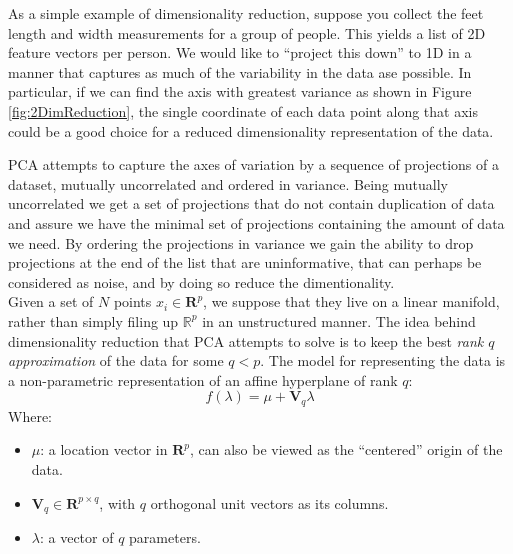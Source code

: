 \documentclass[a4paper]{article}
\begin{document}
As a simple example of dimensionality reduction, suppose you collect the feet length and width measurements for a group of people.  This yields a list of 2D feature vectors per person.  We would like to ``project this down'' to 1D in a manner that captures as much of the variability in the data ase possible.  In particular, if we can find the axis with greatest variance
as shown in Figure \ref{fig:2DimReduction}, the single coordinate of each data point along that axis could be a good choice for a reduced dimensionality representation of the data.

PCA attempts to capture the axes of variation by a sequence of projections of a dataset, mutually uncorrelated and ordered in variance. Being mutually uncorrelated we get a set of projections that do not contain duplication of data and assure we have the minimal set of projections containing the amount of data we need. By ordering the projections in variance we gain the ability to drop projections at the end of the list that are uninformative, that can perhaps be considered as noise, and by doing so reduce the dimentionality.\\

Given a set of $N$ points $x_i \in \mathbf{R}^p$, we suppose that they live on a linear manifold, rather than simply filing up $\mathbb{R}^p$ in an unstructured manner. The idea behind dimensionality reduction that PCA attempts to solve is to keep the best \emph{rank $q$ approximation} of the data for some $q<p$.  The model for representing the data is a non-parametric representation of an affine hyperplane of rank $q$:
$$f(\lambda)= \mu+\mathbf{V}_q \lambda$$
Where:
\begin{itemize}
\item $\mu$: a location vector in $\mathbf{R}^p$, can also be viewed as the ``centered'' origin of the data.
\item $\mathbf{V}_q \in \mathbf{R}^{p\times q}$, with $q$ orthogonal unit vectors as its columns.
\item $\lambda$: a vector of $q$ parameters.
\end{itemize}
\end{document}
